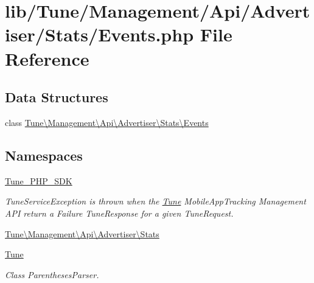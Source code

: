 \hypertarget{Events_8php}{\section{lib/\-Tune/\-Management/\-Api/\-Advertiser/\-Stats/\-Events.php File Reference}
\label{Events_8php}
}
\subsection*{Data Structures}
\begin{DoxyCompactItemize}
\item 
class \hyperlink{classTune_1_1Management_1_1Api_1_1Advertiser_1_1Stats_1_1Events}{Tune\textbackslash{}\-Management\textbackslash{}\-Api\textbackslash{}\-Advertiser\textbackslash{}\-Stats\textbackslash{}\-Events}
\end{DoxyCompactItemize}
\subsection*{Namespaces}
\begin{DoxyCompactItemize}
\item 
\hyperlink{namespaceTune__PHP__SDK}{Tune\-\_\-\-P\-H\-P\-\_\-\-S\-D\-K}
\begin{DoxyCompactList}\small\item\em Tune\-Service\-Exception is thrown when the \hyperlink{namespaceTune}{Tune} Mobile\-App\-Tracking Management A\-P\-I return a Failure Tune\-Response for a given Tune\-Request. \end{DoxyCompactList}\item 
\hyperlink{namespaceTune_1_1Management_1_1Api_1_1Advertiser_1_1Stats}{Tune\textbackslash{}\-Management\textbackslash{}\-Api\textbackslash{}\-Advertiser\textbackslash{}\-Stats}
\item 
\hyperlink{namespaceTune}{Tune}
\begin{DoxyCompactList}\small\item\em Class Parentheses\-Parser. \end{DoxyCompactList}\end{DoxyCompactItemize}
